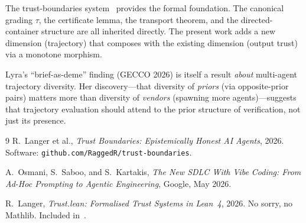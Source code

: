 \documentclass[11pt,a4paper]{article}
\theoremstyle{definition}
\theoremstyle{plain}
\theoremstyle{remark}
\begin{document}
The trust-boundaries system~\cite{trust-boundaries} provides the formal foundation. The canonical grading $\tau$, the certificate lemma, the transport theorem, and the directed-container structure are all inherited directly. The present work adds a new dimension (trajectory) that composes with the existing dimension (output trust) via a monotone morphism.

Lyra's ``brief-as-deme'' finding (GECCO 2026) is itself a result \emph{about} multi-agent trajectory diversity. Her discovery---that diversity of \emph{priors} (via opposite-prior pairs) matters more than diversity of \emph{vendors} (spawning more agents)---suggests that trajectory evaluation should attend to the prior structure of verification, not just its presence.

\begin{thebibliography}{9}
R.~Langer et al., \emph{Trust Boundaries: Epistemically Honest AI Agents}, 2026.
Software: \texttt{github.com/RaggedR/trust-boundaries}.

A.~Osmani, S.~Saboo, and S.~Kartakis, \emph{The New SDLC With Vibe Coding: From Ad-Hoc Prompting to Agentic Engineering}, Google, May 2026.

R.~Langer, \emph{Trust.lean: Formalised Trust Systems in Lean~4}, 2026.
No sorry, no Mathlib. Included in~\cite{trust-boundaries}.
\end{thebibliography}
\end{document}
